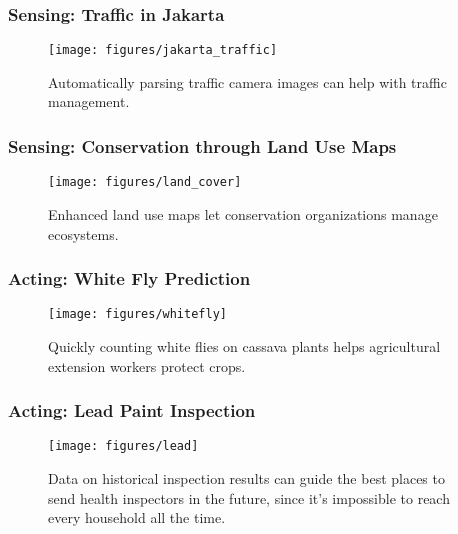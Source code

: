 \documentclass[10pt,mathserif]{beamer}
\begin{document}
\begin{frame}
  \frametitle{Sensing: Traffic in Jakarta}
  \begin{figure}[ht]
    \centering
    \texttt{[image: figures/jakarta\_traffic]}
    \caption{Automatically parsing traffic camera images can help with traffic
      management. \label{fig:label} }
  \end{figure}
\end{frame}

\begin{frame}
  \frametitle{Sensing: Conservation through Land Use Maps}
  \begin{figure}[ht]
    \centering
    \texttt{[image: figures/land\_cover]}
    \caption{Enhanced land use maps let conservation organizations manage
      ecosystems. \label{fig:land_use} }
  \end{figure}
\end{frame}

\begin{frame}
  \frametitle{Acting: White Fly Prediction}
  \begin{figure}[ht]
    \centering
    \texttt{[image: figures/whitefly]}
    \caption{Quickly counting white flies on cassava plants helps agricultural
      extension workers protect crops. \label{fig:whitefly} }
  \end{figure}
\end{frame}

\begin{frame}
  \frametitle{Acting: Lead Paint Inspection}
  \begin{figure}[ht]
    \centering
    \texttt{[image: figures/lead]}
    \caption{Data on historical inspection results can guide the best places to
      send health inspectors in the future, since it's impossible to reach every
      household all the time.
      \label{fig:lead_paint} }
  \end{figure}
\end{frame}
\end{document}
